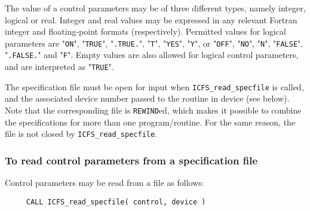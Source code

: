 \documentclass{galahad}
\newcommand{\packagename}{ICFS}
\begin{document}
The value of a control parameters may be of three different types, namely
integer, logical or real.
Integer and real values may be expressed in any relevant Fortran integer and
floating-point formats (respectively). Permitted values for logical
parameters are "{\tt ON}", "{\tt TRUE}", "{\tt .TRUE.}", "{\tt T}",
"{\tt YES}", "{\tt Y}", or "{\tt OFF}", "{\tt NO}",
"{\tt N}", "{\tt FALSE}", "{\tt .FALSE.}" and "{\tt F}".
Empty values are also allowed for
logical control parameters, and are interpreted as "{\tt TRUE}".

The specification file must be open for
input when {\tt \packagename\_read\_specfile}
is called, and the associated device number
passed to the routine in device (see below).
Note that the corresponding
file is {\tt REWIND}ed, which makes it possible to combine the specifications
for more than one program/routine.  For the same reason, the file is not
closed by {\tt \packagename\_read\_specfile}.

\subsubsection{To read control parameters from a specification file}
\label{readspec}

Control parameters may be read from a file as follows:
\hskip0.5in
\def\baselinestretch{0.8} {\tt \begin{verbatim}
     CALL ICFS_read_specfile( control, device )
\end{verbatim}
}
\def\baselinestretch{1.0}
\end{document}

